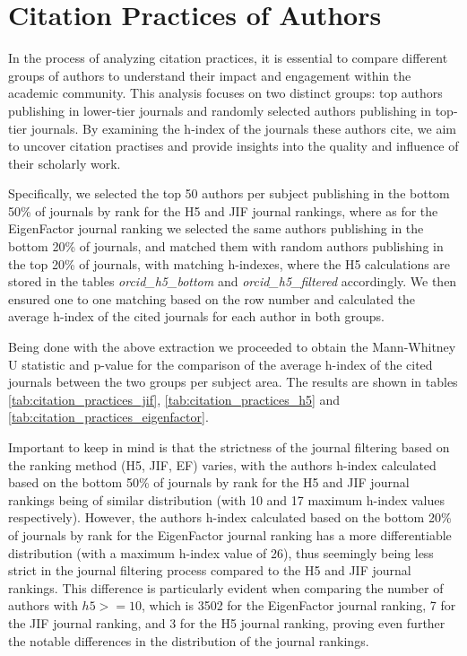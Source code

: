\section{Citation Practices of Authors}

In the process of analyzing citation practices, it is essential to compare
different groups of authors to understand their impact and engagement within
the academic community. This analysis focuses on two distinct groups: top
authors publishing in lower-tier journals and randomly selected authors
publishing in top-tier journals. By examining the h-index of the journals these
authors cite, we aim to uncover citation practises and provide insights into
the quality and influence of their scholarly work.

Specifically, we selected the top 50 authors per subject publishing in the
bottom 50\% of journals by rank for the H5 and JIF journal rankings, where as
for the EigenFactor journal ranking we selected the same authors
publishing in the bottom 20\% of journals, and matched them with random
authors publishing in the top 20\% of journals, with matching h-indexes, where
the H5 calculations are stored in the tables \emph{orcid\_h5\_bottom} and
\emph{orcid\_h5\_filtered} accordingly. We then ensured one to one matching
based on the row number and calculated the average h-index of the cited
journals for each author in both groups.

Being done with the above extraction we proceeded to obtain the Mann-Whitney U
statistic and p-value for the comparison of the average h-index of the cited
journals between the two groups per subject area. The results are shown in
tables \ref{tab:citation_practices_jif}, \ref{tab:citation_practices_h5} and
\ref{tab:citation_practices_eigenfactor}.

Important to keep in mind is that the strictness of the journal filtering based
on the ranking method (H5, JIF, EF) varies, with the authors h-index
calculated based on the bottom 50\% of journals by rank for the H5 and JIF
journal rankings being of similar distribution (with 10 and 17 maximum h-index
values respectively). However, the authors h-index calculated based on the bottom
20\% of journals by rank for the EigenFactor journal ranking has a more differentiable
distribution (with a maximum h-index value of 26), thus seemingly being less
strict in the journal filtering process compared to the H5 and JIF journal
rankings. This difference is particularly evident when comparing the number of
authors with $h5 >= 10$, which is 3502 for the EigenFactor journal ranking, 7 for
the JIF journal ranking, and 3 for the H5 journal ranking, proving even further
the notable differences in the distribution of the journal rankings.


